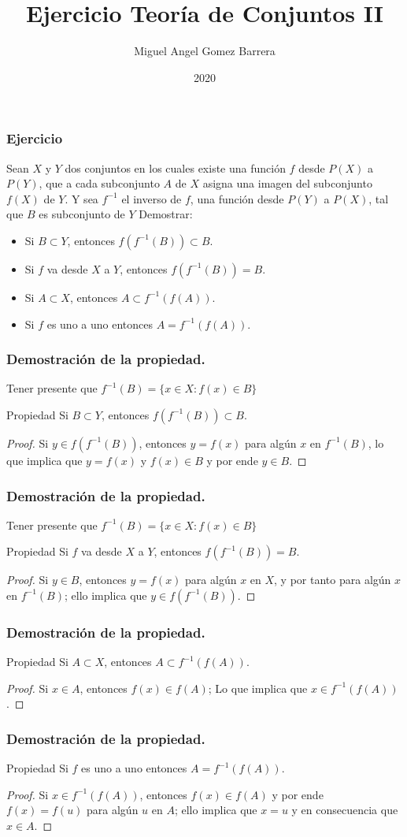 \documentclass{beamer}
\title{Ejercicio Teoría de Conjuntos II}
\author{Miguel Angel Gomez Barrera}
\institute{Fundación Universitaria Konrad Lorenz}
\date{2020}
\begin{document}
	\frame{\titlepage}
	\begin{frame}
		\frametitle{Ejercicio}
		Sean $X$ y $Y$ dos conjuntos en los cuales existe una función $f$ desde $P(X)$ a $P(Y)$, que a cada subconjunto $A$ de $X$ asigna una imagen del subconjunto $f(X)$ de $Y$. Y sea $f^{-1}$ el inverso de $f$, una función desde $P(Y)$ a $P(X)$, tal que $B$ es subconjunto de $Y$
		Demostrar:
		\begin{itemize}
			\item Si $B \subset Y$, entonces $ f(f^{-1}(B))\subset B$.
			\item Si $f$ va desde $X$ a $Y$, entonces $f(f^{-1}(B)) = B$.
			\item Si $A \subset X$, entonces $A \subset f^{-1}(f(A))$.
			\item Si $f$ es uno a uno entonces $A = f^{-1}(f(A))$.
		\end{itemize}
	\end{frame}
	\begin{frame}
		\frametitle{Demostración de la propiedad.}
		Tener presente que $f^{-1} (B) = \{ x \in X: f(x) \in B\}$
		\begin{block}{Propiedad}
			Si $B \subset Y$, entonces $ f(f^{-1}(B))\subset B$.
			\begin{proof}
				Si $y \in f(f^{-1}(B))$, entonces $y= f(x)$ para algún $x$ en $f^{-1}(B)$, lo que implica que $y = f(x)$ y $f(x) \in B$ y por ende $y \in B$.
			\end{proof}
		\end{block} 
	\end{frame}
	\begin{frame}
		\frametitle{Demostración de la propiedad.}
		Tener presente que $f^{-1} (B) = \{ x \in X: f(x) \in B\}$
		\begin{block}{Propiedad}
			Si $f$ va desde $X$ a $Y$, entonces $f(f^{-1}(B)) = B$.
			\begin{proof}
				Si $y \in B$, entonces $y = f(x)$ para algún $x$ en $X$, y por tanto para algún $x$ en $f^{-1}(B)$; ello implica que $y \in f(f^{-1}(B))$.
			\end{proof}
		\end{block} 
	\end{frame}
	\begin{frame}
		\frametitle{Demostración de la propiedad.}
		\begin{block}{Propiedad}
			Si $A \subset X$, entonces $A \subset f^{-1}(f(A))$.
			\begin{proof}
				Si $x \in A$, entonces $f(x) \in f(A)$; Lo que implica que $x \in f^{-1}(f(A))$.
			\end{proof}
		\end{block} 
	\end{frame}
	\begin{frame}
		\frametitle{Demostración de la propiedad.}
		\begin{block}{Propiedad}
			Si $f$ es uno a uno entonces $A = f^{-1}(f(A))$.
			\begin{proof}
				Si $x \in f^{-1}(f(A))$, entonces $f(x) \in f(A)$ y por ende $f(x) = f(u)$ para algún $u$ en $A$; ello implica que $x = u$ y en consecuencia que $x \in A$.
			\end{proof}
		\end{block} 
	\end{frame}
\end{document}
